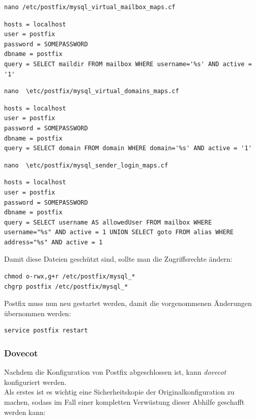 \begin{lstlisting}
nano /etc/postfix/mysql_virtual_mailbox_maps.cf
\end{lstlisting}

\begin{lstlisting}
hosts = localhost
user = postfix
password = SOMEPASSWORD
dbname = postfix
query = SELECT maildir FROM mailbox WHERE username='%s' AND active = '1'
\end{lstlisting}

\begin{lstlisting}
nano  \etc/postfix/mysql_virtual_domains_maps.cf
\end{lstlisting}

\begin{lstlisting}
hosts = localhost
user = postfix
password = SOMEPASSWORD
dbname = postfix
query = SELECT domain FROM domain WHERE domain='%s' AND active = '1'
\end{lstlisting}

\begin{lstlisting}
nano  \etc/postfix/mysql_sender_login_maps.cf
\end{lstlisting}

\begin{lstlisting}
hosts = localhost
user = postfix
password = SOMEPASSWORD
dbname = postfix
query = SELECT username AS allowedUser FROM mailbox WHERE username="%s" AND active = 1 UNION SELECT goto FROM alias WHERE address="%s" AND active = 1
\end{lstlisting}

Damit diese Dateien geschützt sind, sollte man die Zugriffsrechte ändern:

\begin{lstlisting}
chmod o-rwx,g+r /etc/postfix/mysql_*
chgrp postfix /etc/postfix/mysql_*
\end{lstlisting}

Postfix muss nun neu gestartet werden, damit die vorgenommenen Änderungen übernommen werden:

\begin{lstlisting}
service postfix restart
\end{lstlisting}

\subsubsection{Dovecot}
Nachdem die Konfiguration von Postfix abgeschlossen ist, kann \textit{dovecot} konfiguriert werden. \\
Als erstes ist es wichtig eine Sicherheitskopie der Originalkonfiguration zu machen, sodass im Fall einer kompletten Verwüstung dieser Abhilfe geschafft werden kann:

